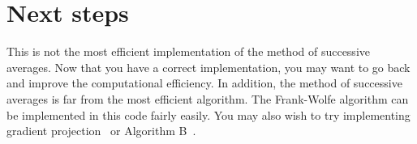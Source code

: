 \documentclass[11pt]{article}
\begin{document}
	
	
	
	
	\section{Next steps}
	
	This is not the most efficient implementation of the method of successive averages. Now that you have a correct implementation, you may want to go back and improve the computational efficiency. In addition, the method of successive averages is far from the most efficient algorithm. The Frank-Wolfe algorithm can be implemented in this code fairly easily. You may also wish to try implementing gradient projection~\citep{jayakrishnan1994faster} or Algorithm B~\citep{dial2006path}.
	
	
	
	
	
	
	
	
	
	
	
\end{document}
